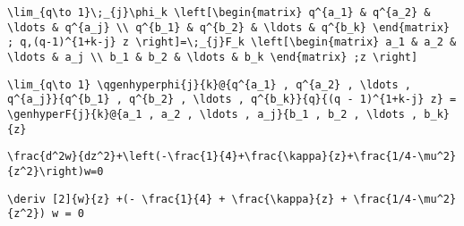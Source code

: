 \newsavebox\BST
\begin{lrbox}{\BST}
 \begin{minipage}[t]{0.82\textwidth}
  \lstinline[language={[latex]TeX},mathescape,breaklines=true]"\lim_{q\to 1}\;_{j}\phi_k \left[\begin{matrix} q^{a_1} & q^{a_2} & \ldots & q^{a_j} \\ q^{b_1} & q^{b_2} & \ldots & q^{b_k} \end{matrix} ; q,(q-1)^{1+k-j} z \right]=\;_{j}F_k \left[\begin{matrix} a_1 & a_2 & \ldots & a_j \\ b_1 & b_2 & \ldots & b_k \end{matrix} ;z \right]"
 \end{minipage}
\end{lrbox}
\newsavebox\BSST
\begin{lrbox}{\BSST}
 \begin{minipage}[t]{0.82\textwidth}
  \lstinline[language={[latex]TeX},mathescape,breaklines=true]"\lim_{q\to 1} \qgenhyperphi{j}{k}@{q^{a_1} , q^{a_2} , \ldots , q^{a_j}}{q^{b_1} , q^{b_2} , \ldots , q^{b_k}}{q}{(q - 1)^{1+k-j} z} = \genhyperF{j}{k}@{a_1 , a_2 , \ldots , a_j}{b_1 , b_2 , \ldots , b_k}{z}"
 \end{minipage}
\end{lrbox}
\newsavebox\BSMM
\begin{lrbox}{\BSMM}
 \begin{minipage}[t]{0.82\textwidth}
  \lstinline[language={[latex]TeX},mathescape,breaklines=true]""
 \end{minipage}
\end{lrbox}
\newsavebox\BSMA
\begin{lrbox}{\BSMA}
 \begin{minipage}[t]{0.82\textwidth}
  \lstinline[language={[latex]TeX},mathescape,breaklines=true]""
 \end{minipage}
\end{lrbox}
\newsavebox\BTT
\begin{lrbox}{\BTT}
 \begin{minipage}[t]{0.82\textwidth}
  \lstinline[language={[latex]TeX},mathescape,breaklines=true]"\frac{d^2w}{dz^2}+\left(-\frac{1}{4}+\frac{\kappa}{z}+\frac{1/4-\mu^2}{z^2}\right)w=0"
 \end{minipage}
\end{lrbox}
\newsavebox\BTST
\begin{lrbox}{\BTST}
 \begin{minipage}[t]{0.82\textwidth}
  \lstinline[language={[latex]TeX},mathescape,breaklines=true]"\deriv [2]{w}{z} +(- \frac{1}{4} + \frac{\kappa}{z} + \frac{1/4-\mu^2}{z^2}) w = 0"
 \end{minipage}
\end{lrbox}
